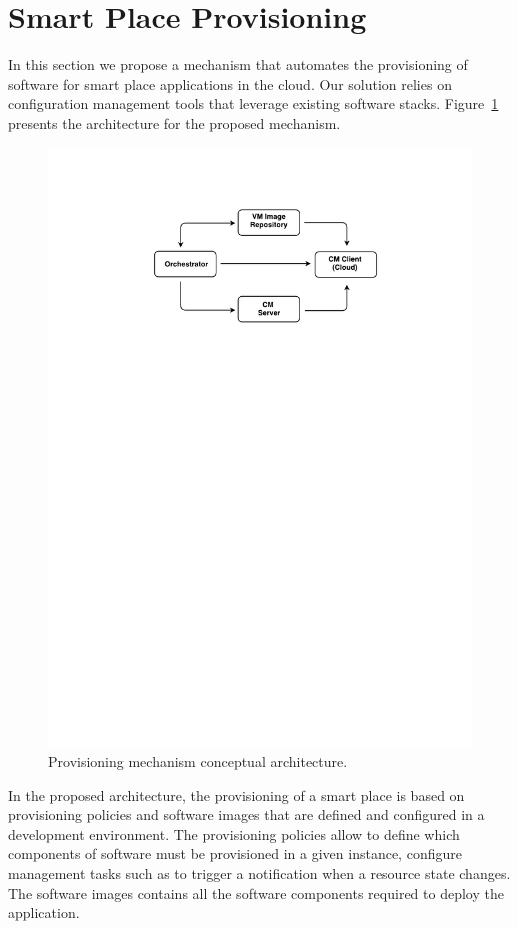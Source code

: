 \section{Smart Place Provisioning}
\label{sec:sol_provisioning}
In this section we propose a mechanism that automates the provisioning of software for smart place
applications in the cloud. Our solution relies on configuration management tools that leverage
existing software stacks. Figure~\ref{fig:provisioning_generic_architecture} presents the architecture
for the proposed mechanism.\\

\begin{figure}[ht!]
  \centering
  \includegraphics[width=.7\textwidth]{images/c4t-generic-solution.pdf}
  \caption[Provisioning mechanism conceptual architecture.]{Provisioning mechanism conceptual architecture.}
  \label{fig:provisioning_generic_architecture}
\end{figure}

In the proposed architecture, the provisioning of a smart place is based on provisioning policies and
software images that are defined and configured in a development environment. The provisioning policies
allow to define which components of software must be provisioned in a given instance, configure
management tasks such as to trigger a notification when a resource state changes. The software images
contains all the software components required to deploy the application.\\

